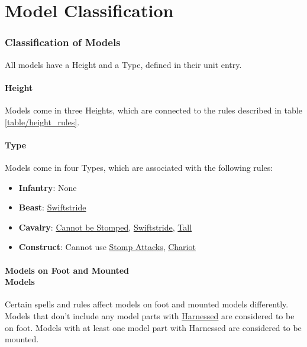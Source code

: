 \part{Model Classification}
\label{model_classification}

\raggedcolumns
\begin{multicols}{2}

\section{Classification of Models}

All models have a Height and a Type, defined in their unit entry.

\subsection{Height}
\label{height}

Models come in three Heights, which are connected to the rules described in table \ref{table/height_rules}.

\subsection{Type}
\label{type}

Models come in four Types, which are associated with the following rules:

\begin{itemize}
	\item {}\textbf{Infantry}: None
	\item {}\textbf{Beast}: \hyperref[swiftstride]{Swiftstride}
	\item {}\textbf{Cavalry}: \hyperref[cannot_be_stomped]{Cannot be Stomped}, \hyperref[swiftstride]{Swiftstride}, \hyperref[tall]{Tall}
	\item {}\textbf{Construct}: Cannot use \hyperref[stomp_attacks]{Stomp Attacks}, \hyperref[chariot]{Chariot}
\end{itemize}

\columnbreak

\subsection[Models on Foot and Mounted Models]{Models on Foot and Mounted\\ Models}
\label{model_on_foot_and_mounted_models}

Certain spells and rules affect models on foot and mounted models differently. Models that don't include any model parts with \hyperref[harnessed]{Harnessed} are considered to be on foot. Models with at least one model part with Harnessed are considered to be mounted.

\end{multicols}

